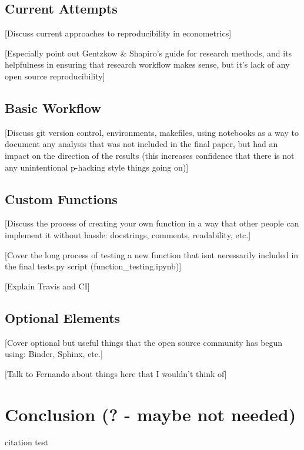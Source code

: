\documentclass[12pt]{article}
\begin{document}
\subsection{Current Attempts}
\textcolor{BrickRed}{[Discuss current approaches to reproducibility in econometrics]}

\textcolor{BrickRed}{[Especially point out Gentzkow \& Shapiro's guide for research methods, and its helpfulness in ensuring that research workflow makes sense, but it's lack of any open source reproducibility]}

\subsection{Basic Workflow}
\textcolor{BrickRed}{[Discuss git version control, environments, makefiles, using notebooks as a way to document any analysis that was not included in the final paper, but had an impact on the direction of the results (this increases confidence that there is not any unintentional p-hacking style things going on)]}

\subsection{Custom Functions}
\textcolor{BrickRed}{[Discuss the process of creating your own function in  a way that other people can implement it without hassle: docstrings, comments, readability, etc.]}

\textcolor{BrickRed}{[Cover the long process of testing a new function that isnt necessarily included in the final tests.py script (function\_testing.ipynb)]}

\textcolor{BrickRed}{[Explain Travis and CI]}

\subsection{Optional Elements}
\textcolor{BrickRed}{[Cover optional but useful things that the open source community has begun using: Binder, Sphinx, etc.]}

\textcolor{BrickRed}{[Talk to Fernando about things here that I wouldn't think of]}


\newpage
\section{Conclusion (? - maybe not needed)}

\newpage
citation test \citep{wooldridge, lasso, IV_orig}



\end{document}
